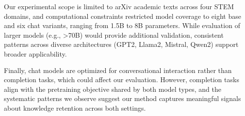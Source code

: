 \documentclass[10pt]{article}
\begin{document}
Our experimental scope is limited to arXiv academic texts across four STEM domains, and computational constraints restricted model coverage to eight base and six chat variants, ranging from 1.5B to 8B parameters. While evaluation of larger models (e.g., >70B) would provide additional validation, consistent patterns across diverse architectures (GPT2, Llama2, Mistral, Qwen2) support broader applicability.

Finally, chat models are optimized for conversational interaction rather than completion tasks, which could affect our evaluation. However, completion tasks align with the pretraining objective shared by both model types, and the systematic patterns we observe suggest our method captures meaningful signals about knowledge retention across both settings.


\end{document}
